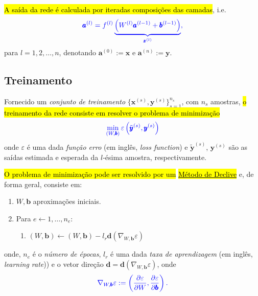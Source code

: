 \hl{A saída da rede é calculada por iteradas composições das camadas}, i.e.
\begin{equation}\color{blue}\pmb{a}^{(l)} = f^{(l)}\underbrace{\left(W^{(l)}\pmb{a}^{(l-1)} + \pmb{b}^{(l-1)}\right)}_{\pmb{z}^{(l)}},
\end{equation}
para $l= 1, 2, \dotsc, n$, denotando $\pmb{a}^{(0)} := \pmb{x}$ e $\pmb{a}^{(n)} := \pmb{y}$.

\subsection{Treinamento}\label{cap_mlp_sec_modelo:ssec:treinamento}

Fornecido um \emph{conjunto de treinamento} $\{\pmb{x}^{(s)}, \pmb{y}^{(s)}\}_{s=1}^{n_s}$, com $n_s$ amostras, \hl{o treinamento da rede consiste em resolver o problema de minimização}
\begin{equation}\color{blue}\min_{(W,\pmb{b})}\varepsilon\left(\tilde{\pmb{y}}^{(s)}, \pmb{y}^{(s)}\right)
\end{equation}
onde $\varepsilon$ é uma dada \emph{função erro} (em inglês, \textit{loss function}) e $\tilde{\pmb{y}}^{(s)}$, $\pmb{y}^{(s)}$ são as saídas estimada e esperada da $l$-ésima amostra, respectivamente.

\hl{O problema de minimização pode ser resolvido por um }\href{https://notaspedrok.com.br/notas/MatematicaNumericaAvancada/cap\_otimizacao_sec_minimi.html}{\hl{Método de Declive}} e, de forma geral, consiste em:
\begin{enumerate}
\item $W, \pmb{b}$ aproximações iniciais.
\item Para $e\leftarrow 1, \dotsc, n_e$:
  \begin{enumerate}\hleq
  \item $\displaystyle (W, \pmb{b}) \leftarrow (W, \pmb{b}) - l_r\pmb{d}\left(\nabla_{W,\pmb{b}} \varepsilon\right)$
  \end{enumerate}
\end{enumerate}
onde, $n_e$ é o \emph{número de épocas}, $l_r$ é uma dada \emph{taxa de aprendizagem} (em inglês, \textit{learning rate})) e o vetor direção $\pmb{d} = \pmb{d}\left(\nabla_{W,\pmb{b}} \varepsilon\right)$, onde
\begin{equation}\color{blue}\nabla_{W,\pmb{b}} \varepsilon := \left(\frac{\partial\varepsilon}{\partial W}, \frac{\partial\varepsilon}{\partial\pmb{b}}\right).
\end{equation}

